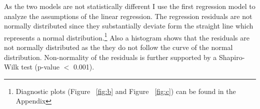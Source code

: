 \documentclass[10pt,a4paper]{article}
\begin{document}
\begin{table}[!htbp] 
\centering 
\caption{Regression Results}\label{tab:b}
\end{table}




As the two models are not statistically different I use the first regression model to analyze the assumptions of the linear regression. The regression residuals are not normally distributed since they substantially deviate form the straight line which represents a normal distribution.\footnote{Diagnostic plots (Figure ~\ref{fig:b} and Figure ~\ref{fig:c}) can be found in the Appendix} Also a histogram shows that the residuals are not normally distributed as the they do not follow the curve of the normal distribution. Non-normality of the residuals is further supported by a Shapiro-Wilk test (p-value $<$ 0.001).\\
\end{document}
